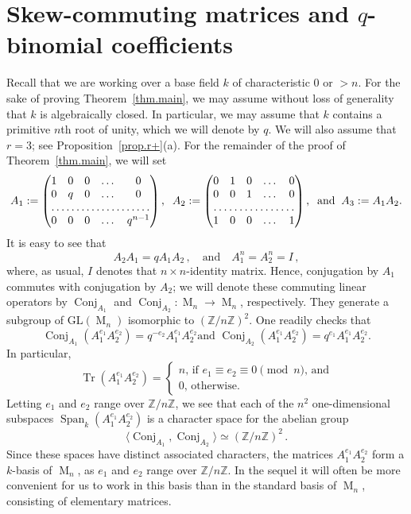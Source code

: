 \documentclass[12pt]{amsart}
\numberwithin{equation}{section}
\numberwithin{subsection}{section}
\theoremstyle{definition} \newtheorem{definition}[theorem]{Definition}
\newcommand\Conj{\operatorname{Conj}}
\newcommand{\GL}{\mathrm{GL}} \newcommand{\Ima}{\operatorname{Im}}
\newcommand\bbZ{\mathbb{Z}}
\newcommand\Span{\operatorname{Span}}
\newcommand{\tr}{\operatorname{Tr}}
\newcommand{\Mat}{\operatorname{M}}
\begin{document}
\section{Skew-commuting matrices and $q$-binomial coefficients}
\label{sect.skew}

Recall that we are working over a base field $k$
of characteristic $0$ or $> n$. For the sake of proving
Theorem~\ref{thm.main}, we may assume without loss of generality that
$k$ is algebraically closed.  In particular, we may assume that
$k$ contains a primitive $n$th root of unity, which we will denote 
by $q$. We will also assume that $r = 3$; see Proposition~\ref{prop.r+}(a).  
For the remainder of the proof of Theorem~\ref{thm.main}, we will set
\begin{equation} \label{e.A1-3}
A_1 := \begin{pmatrix} 1 & 0 & 0 & \dots & 0 \\
                          0 & q & 0 & \dots & 0 \\
                          \hdotsfor{5} \\
                          0 & 0 & 0 & \dots & q^{n-1}
\end{pmatrix},
\; \; 
A_2 := \begin{pmatrix} 0 & 1 & 0 & \dots & 0 \\
 0 & 0 & 1 & \dots & 0 \\
                          \hdotsfor{5} \\
                          1 & 0 & 0 & \dots & 1
\end{pmatrix},
\; \;  \text{and} \; \; A_3 := A_1 A_2.
\end{equation}
It is easy to see that 
\[ A_2 A_1 = q A_1 A_2 \, , \quad \text{and} \quad A_1^n = A_2^n = I \, , \]
where, as usual, $I$ denotes that $n \times n$-identity matrix.
Hence, conjugation by $A_1$ commutes with conjugation by $A_2$; we will denote
these commuting linear operators by $\Conj_{A_1}$ and $\Conj_{A_2} \colon
\Mat_n \to \Mat_n$, respectively. They generate a subgroup of
$\GL(\Mat_n)$ isomorphic to $(\bbZ/n \bbZ)^2$.  
One readily checks that
\[ \text{$\Conj_{A_1} ( A_1^{e_1} A_2^{e_2}) = q^{-e_2} A_1^{e_1} A_2^{e_2}$
and 
$\Conj_{A_2} ( A_1^{e_1} A_2^{e_2}) = q^{e_1} A_1^{e_1} A_2^{e_2}$.} \]
In particular,
\begin{equation} \label{e.trace}
\tr ( A_1^{e_1} A_2^{e_2}) = \begin{cases} 
\text{$n$, if $e_1 \equiv e_2 \equiv 0 \pmod{n}$, and} \\
\text{$0$, otherwise}.
\end{cases}
\end{equation}
Letting $e_1$ and $e_2$ range over $\bbZ/n \bbZ$, we see that
each of the $n^2$ one-dimensional subspaces
$\Span_k(A_1^{e_1} A_2^{e_2})$ is a character space for 
the abelian group
\[ \langle \Conj_{A_1} , \Conj_{A_2} \rangle \simeq
 (\bbZ/n \bbZ)^2 \, . \] 
Since these spaces have distinct associated characters,
the matrices $A_1^{e_1} A_2^{e_2}$ form a $k$-basis
of $\Mat_n$, as $e_1$ and $e_2$ range over $\bbZ/n \bbZ$.
In the sequel it will often be more convenient for us to
work in this basis than in
the standard basis of $\Mat_n$, consisting of elementary matrices.
\end{document}
